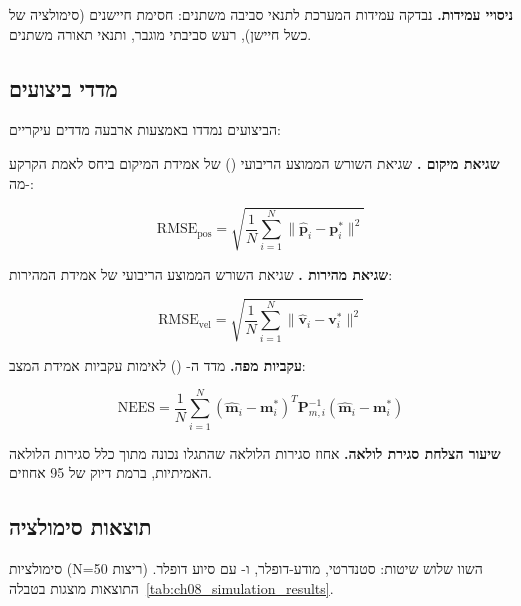 \textbf{ניסויי עמידות.} נבדקה עמידות המערכת לתנאי סביבה משתנים: חסימת חיישנים (סימולציה של כשל חיישן), רעש סביבתי מוגבר, ותנאי תאורה משתנים.

\subsection{מדדי ביצועים}
\label{sec:ch08_metrics}

הביצועים נמדדו באמצעות ארבעה מדדים עיקריים:

\textbf{שגיאת מיקום .} שגיאת השורש הממוצע הריבועי () של אמידת המיקום ביחס לאמת הקרקע מה-:

\begin{equation}
\text{RMSE}_{\text{pos}} = \sqrt{\frac{1}{N} \sum_{i=1}^N \| \hat{\mathbf{p}}_i - \mathbf{p}_i^* \|^2}
\label{eq:ch08_rmse_pos}
\end{equation}

\textbf{שגיאת מהירות .} שגיאת השורש הממוצע הריבועי של אמידת המהירות:

\begin{equation}
\text{RMSE}_{\text{vel}} = \sqrt{\frac{1}{N} \sum_{i=1}^N \| \hat{\mathbf{v}}_i - \mathbf{v}_i^* \|^2}
\label{eq:ch08_rmse_vel}
\end{equation}

\textbf{עקביות מפה.} מדד ה- () לאימות עקביות אמידת המצב:

\begin{equation}
\text{NEES} = \frac{1}{N} \sum_{i=1}^N (\hat{\mathbf{m}}_i - \mathbf{m}_i^*)^T \mathbf{P}_{m,i}^{-1} (\hat{\mathbf{m}}_i - \mathbf{m}_i^*)
\label{eq:ch08_nees}
\end{equation}

\textbf{שיעור הצלחת סגירת לולאה.} אחוז סגירות הלולאה שהתגלו נכונה מתוך כלל סגירות הלולאה האמיתיות, ברמת דיוק של 95 אחוזים.

\subsection{תוצאות סימולציה}
\label{sec:ch08_simulation_results}

סימולציות  (N=50 ריצות) השוו שלוש שיטות:  סטנדרטי,  מודע-דופלר, ו- עם סיוע דופלר. התוצאות מוצגות בטבלה~\ref{tab:ch08_simulation_results}.

